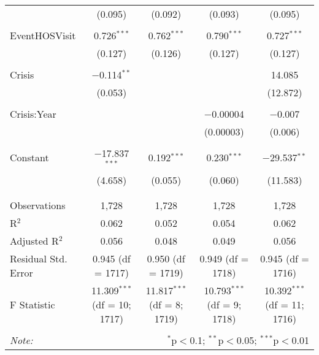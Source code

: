 \documentclass{article}
\begin{document}
\begin{table}[!htbp]
{\begin{tabular}{@{\extracolsep{5pt}}lcccc}
  & (0.095) & (0.092) & (0.093) & (0.095) \\ 
  & & & & \\ 
 EventHOSVisit & 0.726$^{***}$ & 0.762$^{***}$ & 0.790$^{***}$ & 0.727$^{***}$ \\ 
  & (0.127) & (0.126) & (0.127) & (0.127) \\ 
  & & & & \\ 
 Crisis & $-$0.114$^{**}$ &  &  & 14.085 \\ 
  & (0.053) &  &  & (12.872) \\ 
  & & & & \\ 
 Crisis:Year &  &  & $-$0.00004 & $-$0.007 \\ 
  &  &  & (0.00003) & (0.006) \\ 
  & & & & \\ 
 Constant & $-$17.837$^{***}$ & 0.192$^{***}$ & 0.230$^{***}$ & $-$29.537$^{**}$ \\ 
  & (4.658) & (0.055) & (0.060) & (11.583) \\ 
  & & & & \\ 
\hline \\[-1.8ex] 
Observations & 1,728 & 1,728 & 1,728 & 1,728 \\ 
R$^{2}$ & 0.062 & 0.052 & 0.054 & 0.062 \\ 
Adjusted R$^{2}$ & 0.056 & 0.048 & 0.049 & 0.056 \\ 
Residual Std. Error & 0.945 (df = 1717) & 0.950 (df = 1719) & 0.949 (df = 1718) & 0.945 (df = 1716) \\ 
F Statistic & 11.309$^{***}$ (df = 10; 1717) & 11.817$^{***}$ (df = 8; 1719) & 10.793$^{***}$ (df = 9; 1718) & 10.392$^{***}$ (df = 11; 1716) \\ 
\hline 
\hline \\[-1.8ex] 
\textit{Note:}  & \multicolumn{4}{r}{$^{*}$p$<$0.1; $^{**}$p$<$0.05; $^{***}$p$<$0.01} \\ 
\end{tabular}}
\end{table} 
\end{document}
